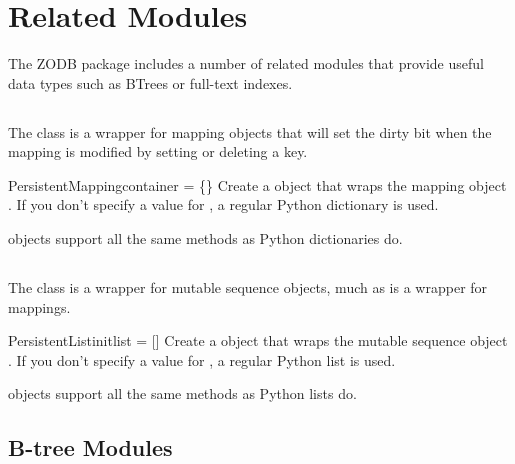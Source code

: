 

\section{Related Modules}

The ZODB package includes a number of related modules that provide
useful data types such as BTrees or full-text indexes.

\subsection{}

The  class is a wrapper for mapping objects
that will set the dirty bit when the mapping is modified by setting or
deleting a key.  

\begin{funcdesc}{PersistentMapping}{container = \{\}}
Create a  object that wraps the 
mapping object .  If you don't specify a
value for , a regular Python dictionary is used.
\end{funcdesc}

 objects support all the same methods as 
Python dictionaries do.

\subsection{}

The  class is a wrapper for mutable sequence objects, 
much as  is a wrapper for mappings.  

\begin{funcdesc}{PersistentList}{initlist = []}
Create a  object that wraps the 
mutable sequence object .  If you don't specify a
value for , a regular Python list is used.
\end{funcdesc}

 objects support all the same methods as 
Python lists do.


\subsection{B-tree Modules}

%

